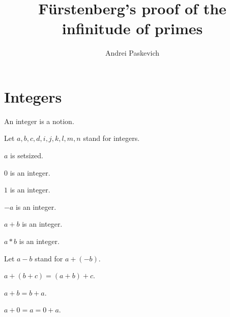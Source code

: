 \documentclass{article}
\title{Fürstenberg's proof of the infinitude of primes}
\author{Andrei Paskevich}
\date{}
\begin{document}

  \maketitle

  \section{Integers}

  \begin{forthel}

    \begin{signature}[Integers]
      An integer is a notion.
    \end{signature}

    Let $a,b,c,d,i,j,k,l,m,n$ stand for integers.

    \begin{axiom}
      $a$ is setsized.
    \end{axiom}

    \begin{signature}[IntZero]
      $0$ is an integer.
    \end{signature}

    \begin{signature}[IntOne]
      $1$ is an integer.
    \end{signature}

    \begin{signature}[IntNeg]
      $-a$ is an integer.
    \end{signature}

    \begin{signature}[IntPlus]
      $a + b$ is an integer.
    \end{signature}

    \begin{signature}[IntMult]
      $a * b$ is an integer.
    \end{signature}

    Let $a - b$ stand for $a + (-b)$.

    \begin{axiom}[AddAsso]
      $a + (b + c) = (a + b) + c$.
    \end{axiom}

    \begin{axiom}[AddComm]
      $a + b = b + a$.
    \end{axiom}

    \begin{axiom}[AddZero]
      $a + 0 = a = 0 + a$.
    \end{axiom}


\end{forthel}
\end{document}
